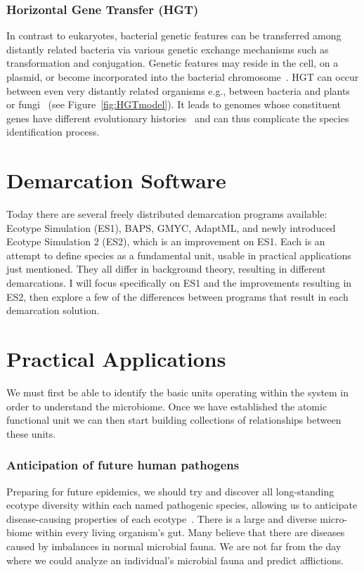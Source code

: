 \subsubsection*{Horizontal Gene Transfer (HGT)}
In contrast to eukaryotes, bacterial genetic features can be transferred among distantly related bacteria via various genetic exchange mechanisms such as transformation and conjugation.
Genetic features may reside in the cell, on a plasmid, or become incorporated into the bacterial chromosome~\cite{staley1997biodiversity}.
HGT can occur between even very distantly related organisms e.g., between bacteria and plants or fungi~\cite{gogarten2002prokaryotic} (see Figure~\ref{fig:HGTmodel}).
It leads to genomes whose constituent genes have different evolutionary histories~\cite{gogarten2002prokaryotic} and can thus complicate the species identification process.


\section{Demarcation Software}
Today there are several freely distributed demarcation programs available: Ecotype Simulation (ES1), BAPS, GMYC, AdaptML, and newly introduced Ecotype Simulation 2 (ES2), which is an improvement on ES1.
Each is an attempt to define species as a fundamental unit, usable in practical applications just mentioned.
They all differ in background theory, resulting in different demarcations.
I will focus specifically on ES1 and the improvements resulting in ES2, then explore a few of the differences between programs that result in each demarcation solution.


\section{Practical Applications}
We must first be able to identify the basic units operating within the system in order to understand the microbiome.
Once we have established the atomic functional unit we can then start building collections of relationships between these units. 

\subsubsection*{Anticipation of future human pathogens}
Preparing for future epidemics, we should try and discover all long-standing ecotype diversity within each named pathogenic species, allowing us to anticipate disease-causing properties of each ecotype~\cite{cohan2007systematics}.
There is a large and diverse micro-biome within every living organism's gut.
Many believe that there are diseases caused by imbalances in normal microbial fauna.
We are not far from the day where we could analyze an individual's microbial fauna and predict afflictions.

